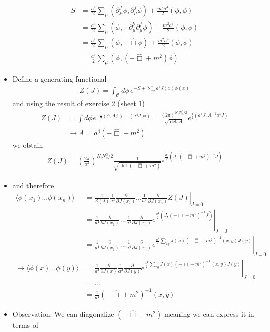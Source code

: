 \documentclass[10pt,a4paper]{article}
\theoremstyle{definition}
\begin{document}
\begin{itemize}
\begin{align}
S
&=\frac{a^4}{2}\sum_\mu(\partial_\mu^f\phi,\partial_\mu^f\phi)+\frac{m^2a^4}{2}(\phi,\phi)\\
&=\frac{a^4}{2}\sum_\mu(\phi,-\partial_\mu^b\partial_\mu^f\phi)+\frac{m^2a^4}{2}(\phi,\phi)\\
&=\frac{a^4}{2}\sum_\mu(\phi,-\hat{\Box}\phi)+\frac{m^2a^4}{2}(\phi,\phi)\\
&=\frac{a^4}{2}\sum_\mu(\phi,(-\hat{\Box}+m^2)\phi)
\end{align}
\item Define a generating functional
\begin{align}
Z(J)=\int_\mathcal{C}d\phi\,e^{-S+\sum_x a^4J(x)\phi(x)}
\end{align}
and using the result of exercise 2 (sheet 1)
\begin{align}
Z(J)&=\int d\phi e^{-\frac{1}{2}(\phi,A\phi)+(a^4 J,\phi)}=\frac{(2\pi)^{N_tN_s^3/2}}{\sqrt{\det{A}}}e^{\frac{1}{2}(a^4J,A^{-1}a^4J)}\\
&\rightarrow A=a^4(-\hat{\Box}+m^2)
\end{align}
we obtain
\begin{align}
Z(J)=\left(\frac{2\pi}{a^4}\right)^{N_t N_s^3/2}\frac{1}{\sqrt{\det(-\hat{\Box}+m^2)}}e^{\frac{a^4}{2}\left(J,(-\hat{\Box}+m^2)^{-1}J\right)}
\end{align}
\item and therefore
\begin{align}
\langle\phi(x_1)...\phi(x_n)\rangle
&=\left.\frac{1}{Z(J)}\frac{1}{a^4}\frac{\partial}{\partial J(x_1)}...\frac{1}{a^4}\frac{\partial}{\partial J(x_n)}Z(J)\right|_{J=0}\\
&=\left.\frac{1}{a^4}\frac{\partial}{\partial J(x_1)}...\frac{1}{a^4}\frac{\partial}{\partial J(x_n)}e^{\frac{a^4}{2}\left(J,(-\hat{\Box}+m^2)^{-1}J\right)}\right|_{J=0}\\
&=\left.\frac{1}{a^4}\frac{\partial}{\partial J(x_1)}...\frac{1}{a^4}\frac{\partial}{\partial J(x_n)}e^{\frac{a^4}{2}\sum_{xy}J(x)(-\hat{\Box}+m^2)^{-1}(x,y)J(y)}\right|_{J=0}\\
\rightarrow\langle\phi(x)...\phi(y)\rangle
&=\left.\frac{1}{a^4}\frac{\partial}{\partial J(x)}\frac{1}{a^4}\frac{\partial}{\partial J(y)}e^{\frac{a^4}{2}\sum_{xy}J(x)(-\hat{\Box}+m^2)^{-1}(x,y)J(y)}\right|_{J=0}\\
&=...\\
&=\frac{1}{a^4}(-\hat{\Box}+m^2)^{-1}(x,y)
\end{align}
\item Observation: We can diagonalize $(-\hat{\Box}+m^2)$ meaning we can express it in terms of 

\end{itemize}
\end{document}
